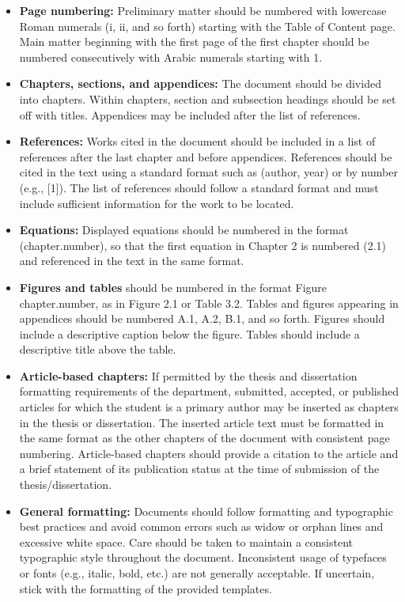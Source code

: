 \begin{itemize}
\item {\bfseries Page numbering:} Preliminary matter should be numbered with lowercase Roman numerals (i, ii, and so forth) starting with the Table of Content page. Main matter beginning with the first page of the first chapter should be numbered consecutively with Arabic numerals starting with 1. 

\item {\bfseries Chapters, sections, and appendices:} The document should be divided into chapters. Within chapters, section and subsection headings should be set off with titles. Appendices may be included after the list of references.

\item {\bfseries References:} Works cited in the document should be included in a list of references after the last chapter and before appendices. References should be cited in the text using a standard format such as (author, year) or by number (e.g., [1]). The list of references should follow a standard format and must include sufficient information for the work to be located. 

\item {\bfseries Equations:} Displayed equations should be numbered in the format (chapter.number), so that the first equation in Chapter 2 is numbered (2.1) and referenced in the text in the same format. 

\item {\bfseries Figures and tables} should be numbered in the format Figure chapter.number, as in Figure 2.1 or Table 3.2. Tables and figures appearing in appendices should be numbered A.1, A.2, B.1, and so forth. Figures should include a descriptive caption below the figure. Tables should include a descriptive title above the table. 

\item {\bfseries Article-based chapters:} If permitted by the thesis and dissertation formatting requirements of the department, submitted, accepted, or published articles for which the student is a primary author may be inserted as chapters in the thesis or dissertation. The inserted article text must be formatted in the same format as the other chapters of the document with consistent page numbering. Article-based chapters should provide a citation to the article and a brief statement of its publication status at the time of submission of the thesis/dissertation.

\item {\bfseries General formatting:} Documents should follow formatting and typographic best practices and avoid common errors such as widow or orphan lines and excessive white space. Care should be taken to maintain a consistent typographic style throughout the document. Inconsistent usage of typefaces or fonts (e.g., italic, bold, etc.) are not generally acceptable. If uncertain, stick with the formatting of the provided templates.
\end{itemize}